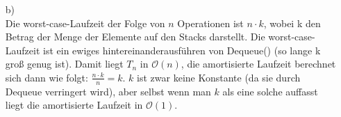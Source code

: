 \documentclass[a4paper,11pt,fleqn]{scrartcl}
\begin{document}
\begin{enumerate}
\begin{enumerate}
\begin{algorithmic}
						\EndWhile
						\EndWhile			
					\EndFunction
			\end{algorithmic}	
			\item[b)]\quad \\
				Die worst-case-Laufzeit der Folge von $n$ Operationen ist $n \cdot k$, wobei k den Betrag 
				der Menge der Elemente auf den Stacks darstellt. Die worst-case-Laufzeit ist ein ewiges 
				hintereinanderausführen von Dequeue() (so lange k groß genug ist). Damit liegt $T_n$ in 
				$\mathcal{O}(n)$, die amortisierte Laufzeit berechnet sich dann wie folgt: $\frac{n\cdot 
				k}{n}=k$. $k$ ist zwar keine Konstante (da sie durch Dequeue verringert wird), aber
				selbst wenn man $k$ als eine solche auffasst liegt die amortisierte Laufzeit in 
				$\mathcal{O}(1)$.
		\end{enumerate}
	\end{enumerate}
\end{document}
